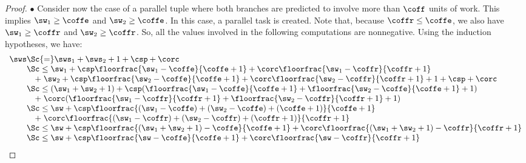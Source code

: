 \begin{proof}
$\bullet$  Consider now the case of a parallel tuple
where both branches are predicted to involve more than $\coff$ units of work.
This implies $\sw_1 \geq \coffe$ and $\sw_2 \geq \coffe$.
In this case, a parallel task is created. 
Note that, because $\coffr \leq \coffe$, we also have 
$\sw_1 \geq \coffr$ and $\sw_2 \geq \coffr$. So, all the values
involved in the following computations are nonnegative.
Using the induction hypotheses, we have:
%
$$\begin{array}{l@{}ll}
\sws 
& \Sc{=} \sws_1 + \sws_2 + 1 + \csp + \corc  \\ 
& \Sc\leq \sw_1 + \csp \floorfrac{\sw_1-\coffe}{\coffe+1} + \corc \floorfrac{\sw_1-\coffr}{\coffr+1} \\
& \quad +\; \sw_2 + \csp \floorfrac{\sw_2-\coffe}{\coffe+1} + \corc \floorfrac{\sw_2-\coffr}{\coffr+1} + 1 + \csp + \corc \\ 
& \Sc\leq (\sw_1 + \sw_2 + 1) + \csp (\floorfrac{\sw_1-\coffe}{\coffe+1} + \floorfrac{\sw_2-\coffe}{\coffe+1} + 1) \\
& \quad +\;\corc (\floorfrac{\sw_1-\coffr}{\coffr+1} + \floorfrac{\sw_2-\coffr}{\coffr+1} + 1)  \\
& \Sc\leq \sw + \csp \floorfrac{(\sw_1-\coffe)+(\sw_2-\coffe)+(\coffe+1)}{\coffe+1}  \\
& \quad +\; \corc \floorfrac{(\sw_1-\coffr)+(\sw_2-\coffr)+(\coffr+1)}{\coffr+1} \\
& \Sc\leq \sw + \csp \floorfrac{(\sw_1+\sw_2+1)-\coffe}{\coffe+1} + \corc \floorfrac{(\sw_1+\sw_2+1)-\coffr}{\coffr+1} \\
& \Sc\leq \sw + \csp \floorfrac{\sw-\coffe}{\coffe+1} + \corc \floorfrac{\sw-\coffr}{\coffr+1}  \\
\end{array}$$


\end{proof}
